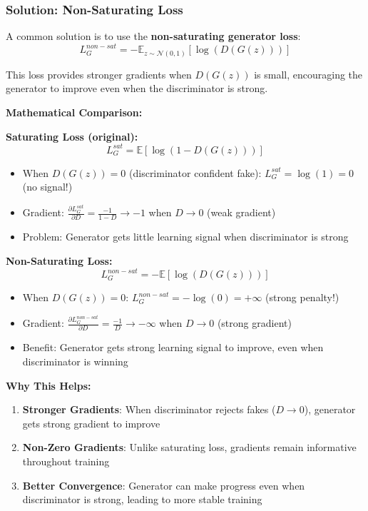 \documentclass[conference,12pt]{IEEEtran}
\begin{document}
\subsubsection{Solution: Non-Saturating Loss}

A common solution is to use the \textbf{non-saturating generator loss}:
\begin{equation}
    L_G^{non-sat} = - \mathbb{E}_{z \sim \mathcal{N}(0,1)}[\log(D(G(z)))]
\end{equation}

This loss provides stronger gradients when $D(G(z))$ is small, encouraging the generator to improve even when the discriminator is strong.

\textbf{Mathematical Comparison:}

\textbf{Saturating Loss (original):}
\begin{equation}
    L_G^{sat} = \mathbb{E}[\log(1-D(G(z)))]
\end{equation}
\begin{itemize}
    \item When $D(G(z)) = 0$ (discriminator confident fake): $L_G^{sat} = \log(1) = 0$ (no signal!)
    \item Gradient: $\frac{\partial L_G^{sat}}{\partial D} = \frac{-1}{1-D} \to -1$ when $D \to 0$ (weak gradient)
    \item Problem: Generator gets little learning signal when discriminator is strong
\end{itemize}

\textbf{Non-Saturating Loss:}
\begin{equation}
    L_G^{non-sat} = -\mathbb{E}[\log(D(G(z)))]
\end{equation}
\begin{itemize}
    \item When $D(G(z)) = 0$: $L_G^{non-sat} = -\log(0) = +\infty$ (strong penalty!)
    \item Gradient: $\frac{\partial L_G^{non-sat}}{\partial D} = \frac{-1}{D} \to -\infty$ when $D \to 0$ (strong gradient)
    \item Benefit: Generator gets strong learning signal to improve, even when discriminator is winning
\end{itemize}

\textbf{Why This Helps:}
\begin{enumerate}
    \item \textbf{Stronger Gradients}: When discriminator rejects fakes ($D \to 0$), generator gets strong gradient to improve
    \item \textbf{Non-Zero Gradients}: Unlike saturating loss, gradients remain informative throughout training
    \item \textbf{Better Convergence}: Generator can make progress even when discriminator is strong, leading to more stable training
\end{enumerate}
\end{document}
